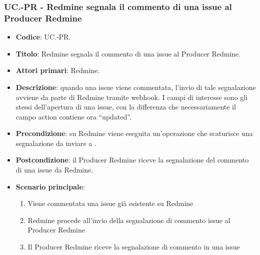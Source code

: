 \subsubsection{UC\theuccount.\thesubuccount-PR - Redmine segnala il commento di una issue al Producer Redmine}
\begin{itemize}
	\item \textbf{Codice}: UC\theuccount.\thesubuccount-PR.
	\item \textbf{Titolo}: Redmine segnala il commento di una issue al Producer Redmine.
	\item \textbf{Attori primari}: Redmine.
	\item \textbf{Descrizione}: quando una issue viene commentata, l'invio di tale segnalazione
	avviene da parte di Redmine tramite webhook.
	I campi di interesse sono gli stessi dell'apertura di una issue, con la differenza che necessariamente il campo action contiene ora ``updated''.
		\item \textbf{Precondizione}: su Redmine viene eseguita un'operazione che scaturisce una
    segnalazione da inviare a \progetto.
	\item \textbf{Postcondizione}: il Producer Redmine riceve la segnalazione del commento di una issue da Redmine.
	\item \textbf{Scenario principale}:
	\begin{enumerate}
		\item Viene commentata una issue già esistente su Redmine
		\item Redmine procede all'invio della segnalazione di commento issue al Producer Redmine
		\item Il Producer Redmine riceve la segnalazione di commento in una issue
	\end{enumerate}

\end{itemize}
